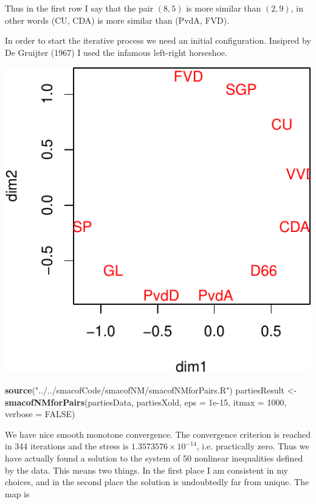 \documentclass[
  12pt,
]{article}
\newenvironment{Shaded}{\begin{snugshade}}{\end{snugshade}}
\newcommand{\AttributeTok}[1]{\textcolor[rgb]{0.13,0.29,0.53}{#1}}
\newcommand{\ConstantTok}[1]{\textcolor[rgb]{0.56,0.35,0.01}{#1}}
\newcommand{\DecValTok}[1]{\textcolor[rgb]{0.00,0.00,0.81}{#1}}
\newcommand{\FloatTok}[1]{\textcolor[rgb]{0.00,0.00,0.81}{#1}}
\newcommand{\FunctionTok}[1]{\textcolor[rgb]{0.13,0.29,0.53}{\textbf{#1}}}
\newcommand{\NormalTok}[1]{#1}
\newcommand{\OtherTok}[1]{\textcolor[rgb]{0.56,0.35,0.01}{#1}}
\newcommand{\StringTok}[1]{\textcolor[rgb]{0.31,0.60,0.02}{#1}}
\begin{document}
Thus in the first row I say that the pair \((8,5)\) is more similar than \((2,9)\), in other words (CU, CDA) is more similar than (PvdA, FVD).

In order to start the iterative process we need an initial configuration. Insipred by De Gruijter (1967) I used
the infamous left-right horseshoe.

\begin{center}\includegraphics{smacofNM_files/figure-latex/partiesxold-1} \end{center}

\begin{Shaded}
\begin{Highlighting}[]
\FunctionTok{source}\NormalTok{(}\StringTok{"../../smacofCode/smacofNM/smacofNMforPairs.R"}\NormalTok{)}
\NormalTok{partiesResult }\OtherTok{\textless{}{-}} \FunctionTok{smacofNMforPairs}\NormalTok{(partiesData, partiesXold, }
                                  \AttributeTok{eps =} \FloatTok{1e{-}15}\NormalTok{, }\AttributeTok{itmax =} \DecValTok{1000}\NormalTok{, }\AttributeTok{verbose =} \ConstantTok{FALSE}\NormalTok{)}
\end{Highlighting}
\end{Shaded}

We have nice smooth monotone convergence. The convergence criterion is reached
in 344 iterations and the stress is \ensuremath{1.3573576\times 10^{-14}}, i.e.
practically zero. Thus we have actually found a solution to the system of
50 nonlinear inequalities defined by the data. This means two things. In the
first place I am consistent in my choices, and in the second place the solution
is undoubtedly far from unique. The map is
\end{document}
